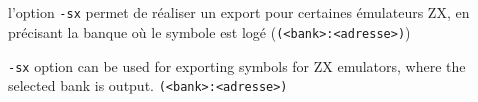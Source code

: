 \subsection{}

\begin{xfr}
l'option \texttt{-sx} permet de réaliser un export pour certaines émulateurs ZX, en précisant la banque où le symbole est logé (\texttt{(<bank>:<adresse>)})

\end{xfr}


\begin{xen}
\texttt{-sx} option can be used for exporting symbols for ZX emulators, where the selected bank is output. \texttt{(<bank>:<adresse>)}
\end{xen}
